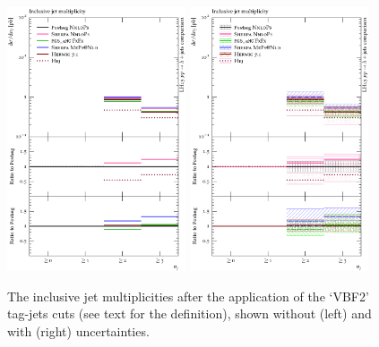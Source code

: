 \begin{figure}[t!]
  \centering
  \includegraphics[width=0.47\textwidth]{figures/hjetscomp_u_NJet_incl_30_VBF2.pdf}
  \hfill
  \includegraphics[width=0.47\textwidth]{figures/hjetscomp_NJet_incl_30_VBF2.pdf}
  \caption{\label{fig:hjetscomp:results:inclobs:njets_VBF2}%
    The inclusive jet multiplicities after the application of the `VBF2'
    tag-jets cuts (see text for the definition), shown without (left)
    and with (right) uncertainties.}
\end{figure}


